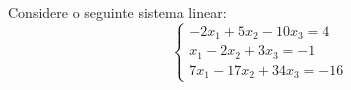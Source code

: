\documentclass[12pt]{exam}
\begin{document}
    Considere o seguinte sistema linear:
    \[
        \begin{cases}
            -2x_1 + 5x_2 - 10x_3 = 4\\
            x_1 - 2x_2 + 3x_3 = -1\\
            7x_1 - 17x_2 + 34x_3 = -16
        \end{cases}
    \]
\end{document}

